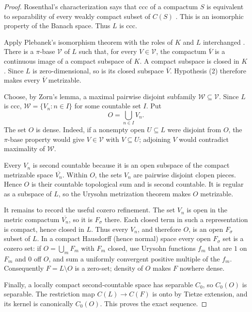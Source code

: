 \documentclass[11pt]{article}
\begin{document}
\begin{proof}
Rosenthal's characterization says that ccc of a compactum $S$ is equivalent
to separability of every weakly compact subset of $C(S)$
\cite{Rosenthal}.  This is an isomorphic property of the Banach space.
Thus $L$ is ccc.

Apply Plebanek's isomorphism theorem with the roles of $K$ and $L$
interchanged \cite{PlebanekIso}.  There is a $\pi$-base $\mathcal V$ of
$L$ such that, for every $V\in\mathcal V$, the compactum $\overline V$ is
a continuous image of a compact subspace of $K$.  A compact subspace is
closed in $K$.  Since $L$ is zero-dimensional, so is its closed subspace
$\overline V$.  Hypothesis (2) therefore makes every $\overline V$
metrizable.

Choose, by Zorn's lemma, a maximal pairwise disjoint subfamily
$\mathcal W\subseteq\mathcal V$.  Since $L$ is ccc,
$\mathcal W=\{V_n:n\in I\}$ for some countable set $I$.  Put
\[
O=\bigcup_{n\in I}V_n.
\]
The set $O$ is dense.  Indeed, if a nonempty open $U\subseteq L$ were
disjoint from $O$, the $\pi$-base property would give
$V\in\mathcal V$ with $V\subseteq U$; adjoining $V$ would contradict
maximality of $\mathcal W$.

Every $V_n$ is second countable because it is an open subspace of the
compact metrizable space $\overline{V_n}$.  Within $O$, the sets $V_n$ are
pairwise disjoint clopen pieces.  Hence $O$ is their countable topological
sum and is second countable.  It is regular as a subspace of $L$, so the
Urysohn metrization theorem makes $O$ metrizable.

It remains to record the useful cozero refinement.  The set $V_n$ is open
in the metric compactum $\overline{V_n}$, so it is $F_\sigma$ there.  Each
closed term in such a representation is compact, hence closed in $L$.
Thus every $V_n$, and therefore $O$, is an open $F_\sigma$ subset of $L$.
In a compact Hausdorff (hence normal) space every open $F_\sigma$ set is a
cozero set: if $O=\bigcup_m F_m$ with $F_m$ closed, use Urysohn functions
$f_m$ that are $1$ on $F_m$ and $0$ off $O$, and sum a uniformly
convergent positive multiple of the $f_m$.  Consequently
$F=L\setminus O$ is a zero-set; density of $O$ makes $F$ nowhere dense.

Finally, a locally compact second-countable space has separable $C_0$,
so $C_0(O)$ is separable.  The restriction map $C(L)\to C(F)$ is onto by
Tietze extension, and its kernel is canonically $C_0(O)$.  This proves the
exact sequence.
\end{proof}
\end{document}

